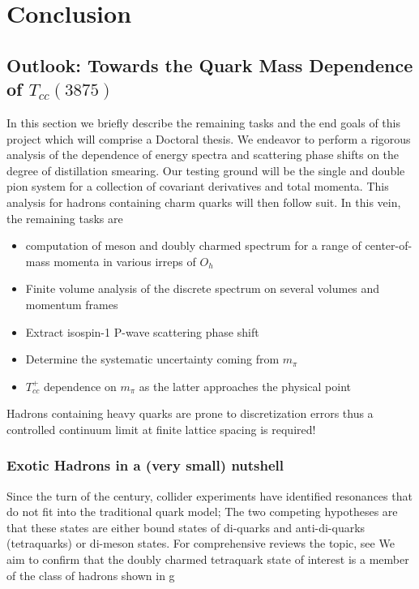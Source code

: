 
\chapter{Conclusion}\label{sec:tcc}

\section{Outlook: Towards the Quark Mass Dependence of $T_{cc}(3875)$}
In this section we briefly describe the remaining tasks and the end goals of this project which will comprise a Doctoral thesis. We endeavor to perform a rigorous analysis of the dependence of energy spectra and scattering phase shifts on the degree of distillation smearing. Our testing ground will be the single and double pion system for a collection of covariant derivatives and total momenta. This analysis for hadrons containing charm quarks will then follow suit. In this vein, the remaining tasks are 
\begin{itemize}
    \item computation of meson and doubly charmed spectrum for a range of center-of-mass momenta in various irreps of $O_h$
    \item Finite volume analysis of the discrete spectrum on several volumes and momentum frames
    \item Extract isospin-1 P-wave scattering phase shift 
    \item Determine the systematic uncertainty coming from $m_\pi$ 
    \item $T_{cc}^+$ dependence on $m_\pi$ as the latter approaches the physical point
\end{itemize}
Hadrons containing heavy quarks are prone to discretization errors thus a controlled continuum limit at finite lattice spacing is required!


\subsection{Exotic Hadrons in a (very small) nutshell}
Since the turn of the century, collider experiments have identified resonances that do not fit into the traditional quark model; The two competing hypotheses are that these states are either bound states of di-quarks and anti-di-quarks (tetraquarks) or di-meson states. 
For comprehensive reviews the topic, see \cite{Chen}\cite{Guo:2017jvc} \cite{Brambilla:2019esw}We aim to confirm that the doubly charmed tetraquark state of interest is a member of the class of hadrons shown in g

